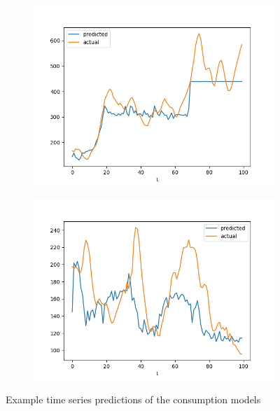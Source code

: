 \documentclass[runningheads]{llncs}
\begin{document}
\begin{figure}
\begin{subfigure}{\figwidth}
            \includegraphics[width=\textwidth]{results/evaluation/c_model_graph_p90.png}
        \end{subfigure}
        \begin{subfigure}{\figwidth}
            \includegraphics[width=\textwidth]{results/evaluation/c_model_graph_p100.png}
        \end{subfigure}
        \caption{Example time series predictions of the consumption models}
        \label{fig:consumption-prediction-examples}
    \end{figure}



\end{document}
